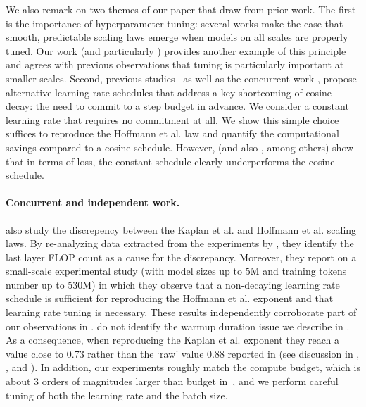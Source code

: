\documentclass{article}
\makeatletter
\theoremstyle{plain}
\theoremstyle{definition}
\theoremstyle{remark}
\newcommand{\Kaplan}{Kaplan et al.\@\xspace}
\newcommand{\Hoffmann}{Hoffmann et al.\@\xspace}
\makeatother
\begin{document}
{We also remark on two themes of our paper that draw from prior work. The first is the importance of hyperparameter tuning: several works \cite{kaplan2020scaling,ivgi2022scaling,gadre2024language,deepseekai2024deepseek} make the case that smooth, predictable scaling laws emerge when models on all scales are properly tuned. Our work (and particularly ) provides another example of this principle and agrees with previous observations that tuning is particularly important at smaller scales. 
Second, previous studies~\cite{zhai2022scaling,bellagente2024stable,deepseekai2024deepseek,hu2024minicpm} as well as the concurrent work \cite{hagele2024scaling}, propose alternative learning rate schedules that address a key shortcoming of cosine decay: the need to commit to a step budget in advance. We consider a constant learning rate that requires no commitment at all. We show this simple choice suffices to reproduce the \Hoffmann law and quantify the computational savings compared to a cosine schedule. However,  (and also \cite{hoffmann2022empirical}, among others) show that in terms of loss, the constant schedule clearly underperforms the cosine schedule.   }
\paragraph{Concurrent and independent work.} \citet{pearce2024reconciling} also study the discrepency between the \Kaplan and \Hoffmann scaling laws. By re-analyzing data extracted from the \citet{hoffmann2022empirical} experiments by \citet{besiroglu2024chinchilla}, they identify the last layer FLOP count as a cause for the discrepancy. Moreover, they report on a small-scale experimental study (with model sizes up to $5$M and training tokens number up to $530$M) in which they observe that a non-decaying learning rate schedule is sufficient for reproducing the \Hoffmann exponent and that learning rate tuning is necessary. These results independently corroborate part of our observations in . \citet{pearce2024reconciling} do not identify the warmup duration issue we describe in . As a consequence, when reproducing the \Kaplan exponent they reach a value close to 0.73 rather than the `raw' value 0.88 reported in \citet{kaplan2020scaling} (see discussion in , , and ). In addition, our experiments roughly match the \citet{kaplan2020scaling} compute budget, which is about 3 orders of magnitudes larger than budget in~\citet{pearce2024reconciling}, and we perform careful tuning of both the learning rate and the batch size. 
\end{document}
